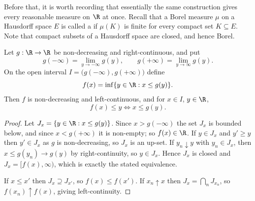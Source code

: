 Before that, it is worth recording that essentially the same construction gives every reasonable measure on $\R$ at once. Recall that a Borel measure $\mu$ on a Hausdorff space $E$ is called a  if $\mu(K)$ is finite for every compact set $K \subseteq E$. Note that compact subsets of a Hausdorff space are closed, and hence Borel.

\begin{lemma}\label{lem:gen-inverse}
	Let $g : \R \to \R$ be non-decreasing and right-continuous, and put
	$$
	g(-\infty) = \lim_{y \to -\infty} g(y), \qquad g(+\infty) = \lim_{y\to\infty}g(y).
	$$
	On the open interval $I = \big(g(-\infty), g(+\infty)\big)$ define
	$$
	f(x) = \inf\{ y \in \R : x \leq g(y)\}.
	$$
	Then $f$ is non-decreasing and left-continuous, and for $x \in I$, $y \in \R$,
	$$
	f(x) \leq y \iff x \leq g(y).
	$$
\end{lemma}
\begin{proof}
	Let $J_x = \{y \in \R : x \leq g(y)\}$. Since $x > g(-\infty)$ the set $J_x$ is bounded below, and since $x < g(+\infty)$ it is non-empty; so $f(x) \in \R$. If $y \in J_x$ and $y' \geq y$ then $y' \in J_x$ as $g$ is non-decreasing, so $J_x$ is an up-set. If $y_n \downarrow y$ with $y_n \in J_x$, then $x \leq g(y_n) \to g(y)$ by right-continuity, so $y \in J_x$. Hence $J_x$ is closed and $J_x = [f(x), \infty)$, which is exactly the stated equivalence.

	If $x \leq x'$ then $J_{x} \supseteq J_{x'}$, so $f(x) \leq f(x')$. If $x_n \uparrow x$ then $J_x = \bigcap_n J_{x_n}$, so $f(x_n) \uparrow f(x)$, giving left-continuity.
\end{proof}

